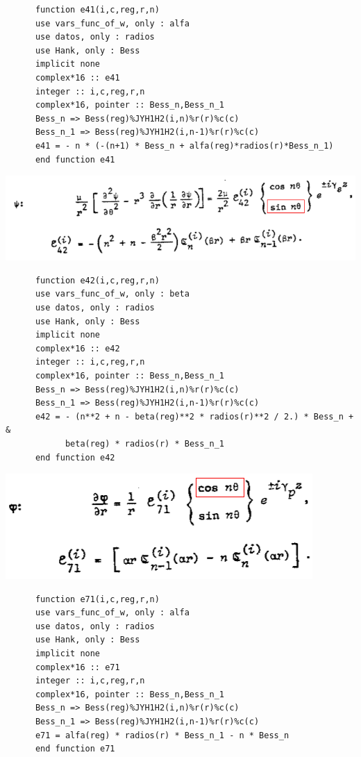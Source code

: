 \documentclass [11pt,spanish]{article}
\begin{document}
\begingroup
\fontsize{10pt}{12pt}
\selectfont
{}
\begin{shaded}
\begin{verbatim}
      function e41(i,c,reg,r,n)
      use vars_func_of_w, only : alfa
      use datos, only : radios
      use Hank, only : Bess
      implicit none
      complex*16 :: e41
      integer :: i,c,reg,r,n
      complex*16, pointer :: Bess_n,Bess_n_1
      Bess_n => Bess(reg)%JYH1H2(i,n)%r(r)%c(c)
      Bess_n_1 => Bess(reg)%JYH1H2(i,n-1)%r(r)%c(c)
      e41 = - n * (-(n+1) * Bess_n + alfa(reg)*radios(r)*Bess_n_1)
      end function e41
\end{verbatim}
\end{shaded}
\endgroup
\includegraphics[scale=0.5]{e42}
\begingroup
\fontsize{10pt}{12pt}
\selectfont
{}
\begin{shaded}
\begin{verbatim}
      function e42(i,c,reg,r,n)
      use vars_func_of_w, only : beta
      use datos, only : radios
      use Hank, only : Bess
      implicit none
      complex*16 :: e42
      integer :: i,c,reg,r,n
      complex*16, pointer :: Bess_n,Bess_n_1
      Bess_n => Bess(reg)%JYH1H2(i,n)%r(r)%c(c)
      Bess_n_1 => Bess(reg)%JYH1H2(i,n-1)%r(r)%c(c)
      e42 = - (n**2 + n - beta(reg)**2 * radios(r)**2 / 2.) * Bess_n + &
            beta(reg) * radios(r) * Bess_n_1
      end function e42
\end{verbatim}
\end{shaded}
\endgroup
\includegraphics[scale=0.5]{e71}
\begingroup
\fontsize{10pt}{12pt}
\selectfont
{}
\begin{shaded}
\begin{verbatim}
      function e71(i,c,reg,r,n)
      use vars_func_of_w, only : alfa
      use datos, only : radios
      use Hank, only : Bess
      implicit none
      complex*16 :: e71
      integer :: i,c,reg,r,n
      complex*16, pointer :: Bess_n,Bess_n_1
      Bess_n => Bess(reg)%JYH1H2(i,n)%r(r)%c(c)
      Bess_n_1 => Bess(reg)%JYH1H2(i,n-1)%r(r)%c(c)
      e71 = alfa(reg) * radios(r) * Bess_n_1 - n * Bess_n
      end function e71
\end{verbatim}
\end{shaded}
\end{document}

